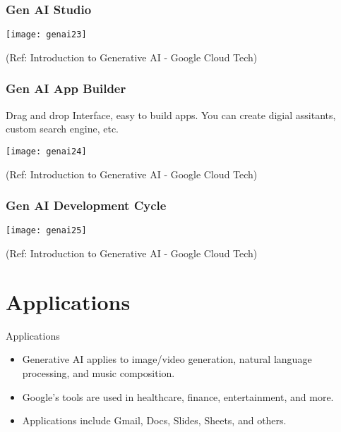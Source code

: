 \begin{frame}[fragile]\frametitle{Gen AI Studio}

\begin{center}
\texttt{[image: genai23]}
\end{center}


{\tiny (Ref: Introduction to Generative AI - Google Cloud Tech)}

\end{frame}


\begin{frame}[fragile]\frametitle{Gen AI App Builder}

Drag and drop Interface, easy to build apps. You can create digial assitants, custom search engine, etc.

\begin{center}
\texttt{[image: genai24]}
\end{center}


{\tiny (Ref: Introduction to Generative AI - Google Cloud Tech)}

\end{frame}

\begin{frame}[fragile]\frametitle{Gen AI Development Cycle}

\begin{center}
\texttt{[image: genai25]}
\end{center}


{\tiny (Ref: Introduction to Generative AI - Google Cloud Tech)}

\end{frame}

\section{Applications}

\begin{frame}[fragile]{Applications}
\begin{itemize}
\item Generative AI applies to image/video generation, natural language processing, and music composition.
\item Google's tools are used in healthcare, finance, entertainment, and more.
\item Applications include Gmail, Docs, Slides, Sheets, and others.
\end{itemize}
\end{frame}

